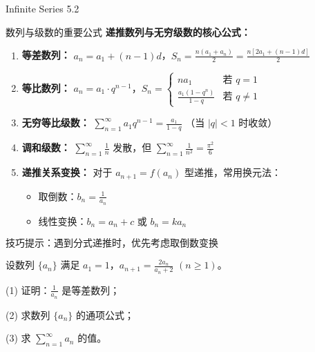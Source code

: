 \documentclass{ctexart}
\newcommand{\highlight}[1]{\colorbox{sunsityellow!20}{\ensuremath{#1}}}
\begin{document}
\newpage

\begin{center}
    \begin{chaptertitle}{\faInfinity}{Infinite Series 5.2}
    \end{chaptertitle}
\end{center}

\begin{formulabox}{数列与级数的重要公式}
\textbf{递推数列与无穷级数的核心公式：}

\begin{enumerate}[leftmargin=15pt, itemsep=6pt]
    \item \textbf{等差数列：} $a_n = a_1 + (n-1)d$，$S_n = \frac{n(a_1 + a_n)}{2} = \frac{n[2a_1 + (n-1)d]}{2}$
    
    \item \textbf{等比数列：} $a_n = a_1 \cdot q^{n-1}$，$S_n = \begin{cases} 
        na_1 & \text{若 } q = 1 \\
        \frac{a_1(1-q^n)}{1-q} & \text{若 } q \neq 1
    \end{cases}$
    
    \item \textbf{无穷等比级数：} $\sum_{n=1}^{\infty} a_1 q^{n-1} = \frac{a_1}{1-q}$ （当 $|q| < 1$ 时收敛）
    
    \item \textbf{调和级数：} $\sum_{n=1}^{\infty} \frac{1}{n}$ 发散，但 $\sum_{n=1}^{\infty} \frac{1}{n^2} = \frac{\pi^2}{6}$
    
    \item \textbf{递推关系变换：} 对于 $a_{n+1} = f(a_n)$ 型递推，常用换元法：
    \begin{itemize}
        \item 取倒数：$b_n = \frac{1}{a_n}$
        \item 线性变换：$b_n = a_n + c$ 或 $b_n = ka_n$
    \end{itemize}
\end{enumerate}

\highlight{\text{技巧提示：遇到分式递推时，优先考虑取倒数变换}}
\end{formulabox}

\begin{exercisebox}{5.1}
设数列 $\{a_n\}$ 满足 $a_1 = 1$，$a_{n+1} = \frac{2a_n}{a_n + 2}$ $(n \geq 1)$。

(1) 证明：$\frac{1}{a_n}$ 是等差数列；

(2) 求数列 $\{a_n\}$ 的通项公式；

(3) 求 $\sum_{n=1}^{\infty} a_n$ 的值。
\end{exercisebox}
\end{document}
